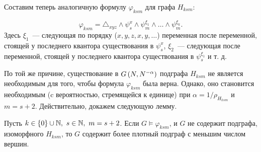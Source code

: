 Составим теперь аналогичную формулу $\varphi_{ksm}$ для графа $H_{ksm}$:

\[ \varphi_{ksm} =  \triangle_{xyz} \wedge \psi_{s}^{x} \wedge \psi_{m}^{\xi_1} \wedge \ldots \wedge \psi_{m}^{\xi_{k}} .\]
Здесь $\xi_1$~--- следующая по порядку ($x,y,z,x,y,\ldots$) переменная после переменной, стоящей у последнего квантора существования в $\psi^x_s$, $\xi_2$~--- следующая после переменной, стоящей у последнего квантора существования в $\psi^{\xi_1}_s$ и т. д.




По той же причине, существование в $G\left(N,N^{-\alpha}\right)$ подграфа $H_{ksm}$ не является необходимым для того, чтобы формула $\varphi_{ksm}$ была верна.
Однако, оно становится необходимым (c вероятностью, стремящейся к единице) при $\alpha = 1/\rho_{H_{ksm}}$ и $m = s+2$. 
Действительно, докажем следующую лемму.

\begin{Lem} 
\label{lem:min_ro_Hksm}
Пусть $k \in \{0\} \cup \mathbb {N},~s \in \mathbb {N},~ m=s+2$. Если $G \vDash \varphi_{ksm}$, и $G$ не содержит подграфа, изоморфного $H_{ksm}$, то $G$ содержит более плотный подграф с меньшим числом вершин.
\end{Lem}

